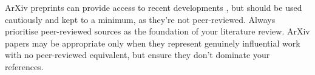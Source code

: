 \documentclass[a4paper, twocolumn]{article}
\begin{document}
ArXiv preprints can provide access to recent developments
\cite{alexander}, but should be used cautiously and
kept to a minimum, as they’re not peer-reviewed.
Always prioritise peer-reviewed sources as the foundation of your literature review. ArXiv papers
may be appropriate only when they represent genuinely
influential work with no peer-reviewed equivalent, but ensure they don’t dominate your references.

\printbibliography
\end{document}
